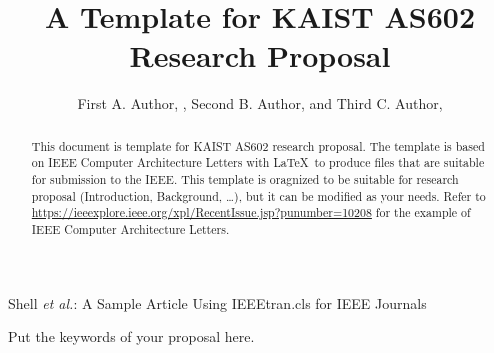 \documentclass[journal,9pt]{IEEEtran}
\begin{document}
\title{A Template for KAIST AS602 Research Proposal}

\author{First A. Author, , Second B. Author, and Third C. Author, 

}

%
{Shell \MakeLowercase{\textit{et al.}}: A Sample Article Using IEEEtran.cls for IEEE Journals}


\maketitle
\begin{abstract}
  This document is template for KAIST AS602 research proposal.
  The template is based on IEEE Computer Architecture Letters with \LaTeX \ to produce files that are suitable for submission to the IEEE.
  This template is oragnized to be suitable for research proposal (Introduction, Background, \dots), but it can be modified as your needs.
  Refer to \url{https://ieeexplore.ieee.org/xpl/RecentIssue.jsp?punumber=10208} for the example of IEEE Computer Architecture Letters.
\end{abstract}

\begin{IEEEkeywords}
  Put the keywords of your proposal here.
\end{IEEEkeywords}
\end{document}
